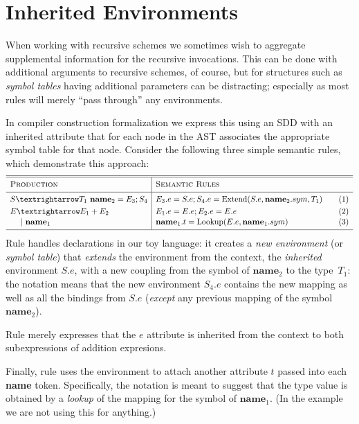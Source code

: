 \documentclass[11pt]{article} %
\begin{document}
\section{Inherited Environments}
\label{sec:env}

When working with recursive schemes we sometimes wish to aggregate supplemental information for the
recursive invocations. This can be done with additional arguments to recursive schemes, of course,
but for structures such as \emph{symbol tables} having additional parameters can be distracting;
especially as most rules will merely ``pass through'' any environments.

In compiler construction formalization we express this using an SDD with an inherited attribute that
for each node in the AST associates the appropriate symbol table for that node. Consider the
following three simple semantic rules, which demonstrate this approach:
\begin{equation*}
  \begin{array}{l|ll}
    \hline
    \hline
    \textsc{Production}  & \textsc{Semantic Rules} \Bigstrut&\\
    \hline
    S → T_1 ~ \textbf{name}_2 = E_3; S_4
    &
    E_3.e = S.e; 
    S_4.e = \op{Extend}(S.e, \textbf{name}_2.sym, T_1) \Bigstrut\quad
    &\thetag{1}
    \\[\jot]
    E → E_1 + E_2
    &
    E_1.e=E.e; E_2.e=E.e
    &\thetag{2}
    \\[1pt]
    \quad~\mid \textbf{name}_1
    &
    \textbf{name}_1.t = \op{Lookup}(E.e, \textbf{name}_1.sym)
    &\thetag{3}
    \\[\jot]
    \hline
  \end{array}
\end{equation*}
Rule  handles declarations in our toy language: it creates a \emph{new environment} (or
\emph{symbol table}) that \emph{extends} the environment from the context, the \emph{inherited}
environment $S.e$, with a new coupling from the symbol of $\textbf{name}_2$ to the type~$T_1$: the
notation means that the new environment $S_4.e$ contains the new mapping as well as all the bindings
from $S.e$ (\emph{except} any previous mapping of the symbol $\textbf{name}_2$).

Rule  merely expresses that the $e$ attribute is inherited from the context to both
subexpressions of addition expresions.

Finally, rule  uses the environment to attach another attribute $t$ passed into each
\textbf{name} token. Specifically, the notation is meant to suggest that the type value is obtained
by a \emph{lookup} of the mapping for the symbol of $\textbf{name}_1$. (In the example we are not
using this for anything.)
\end{document}
